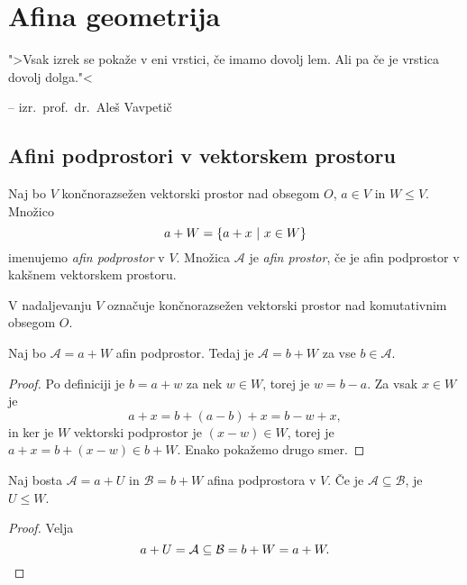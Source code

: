 \section{Afina geometrija}

\epigraph{">Vsak izrek se pokaže v eni vrstici, če imamo dovolj lem. Ali pa če je vrstica dovolj dolga."<}
{-- izr.~prof.~dr.~Aleš Vavpetič}

\subsection{Afini podprostori v vektorskem prostoru}


\begin{definicija}
    Naj bo $V$ končnorazsežen vektorski prostor nad obsegom $O$, $a \in V$ in $W \leq V$. Množico
    \[
    a + W = \left\{a + x~\middle\vert~x \in W\right\}
    \]
    imenujemo \emph{afin podprostor} v $V$.
    Množica $\mathcal{A}$ je \emph{afin prostor}, če je afin podprostor v kakšnem vektorskem prostoru.
\end{definicija}

\begin{opomba}
    V nadaljevanju $V$ označuje končnorazsežen vektorski prostor nad komutativnim obsegom $O$.
\end{opomba}

\begin{lema}
    Naj bo $\mathcal{A} = a + W$ afin podprostor. Tedaj je $\mathcal{A} = b + W$ za vse $b \in \mathcal{A}$.
\end{lema}

\begin{proof}
    Po definiciji je $b = a + w$ za nek $w \in W$, torej je $w = b - a$. Za vsak $x \in W$ je
    \[
    a + x = b + (a - b) + x = b - w + x,
    \]
    in ker je $W$ vektorski podprostor je $(x - w) \in W$, torej je $a + x = b + (x - w) \in b + W$. Enako pokažemo drugo smer.
\end{proof}

\begin{posledica}
    Naj bosta $\mathcal{A} = a + U$ in $\mathcal{B} = b + W$ afina podprostora v $V$. Če je $\mathcal{A} \subseteq \mathcal{B}$, je $U \leq W$.
\end{posledica}

\begin{proof}
	Velja
	\[    
    a + U = \mathcal{A} \subseteq \mathcal{B} = b + W = a + W. \qedhere
    \]
\end{proof}

